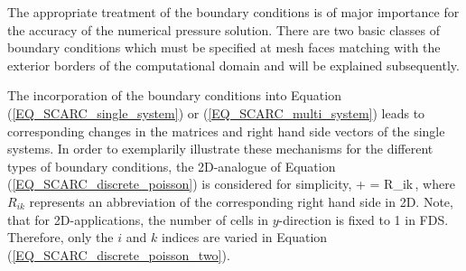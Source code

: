 The appropriate treatment of the boundary conditions is of major importance for the accuracy of the numerical pressure solution. There are two basic classes of boundary conditions which must be specified at mesh faces matching with the exterior borders of the computational domain and will be explained subsequently. 

The incorporation of the boundary conditions into Equation (\ref{EQ_SCARC_single_system}) or (\ref{EQ_SCARC_multi_system}) leads to corresponding changes in the matrices and right hand side vectors of the single systems. In order to exemplarily illustrate these mechanisms for the different types of boundary conditions, the 2D-analogue of Equation (\ref{EQ_SCARC_discrete_poisson}) is considered for simplicity,
\be
{} +
  = R_{ik}\,,
\label{EQ_SCARC_discrete_poisson_two}
\ee
where $R_{ik}$ represents an abbreviation of the corresponding right hand side in 2D.
Note, that for 2D-applications, the number of cells in $y$-direction is fixed to 1 in FDS. Therefore, only the $i$ and $k$ indices are varied in Equation (\ref{EQ_SCARC_discrete_poisson_two}).

